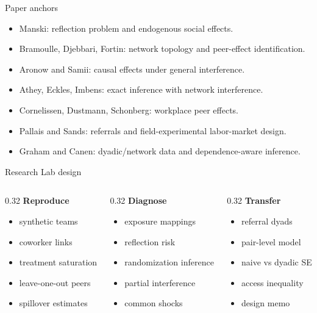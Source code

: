 \documentclass[aspectratio=169,11pt]{beamer}
\newcommand{\1}{\mathbf{1}}
\begin{document}
\begin{frame}{Paper anchors}
\begin{itemize}
    \item Manski: reflection problem and endogenous social effects.
    \item Bramoulle, Djebbari, Fortin: network topology and peer-effect identification.
    \item Aronow and Samii: causal effects under general interference.
    \item Athey, Eckles, Imbens: exact inference with network interference.
    \item Cornelissen, Dustmann, Schonberg: workplace peer effects.
    \item Pallais and Sands: referrals and field-experimental labor-market design.
    \item Graham and Canen: dyadic/network data and dependence-aware inference.
\end{itemize}
\end{frame}

\begin{frame}{Research Lab design}
\begin{columns}[T,onlytextwidth]
\begin{column}{0.32\linewidth}
\textbf{Reproduce}
\begin{itemize}
    \item synthetic teams
    \item coworker links
    \item treatment saturation
    \item leave-one-out peers
    \item spillover estimates
\end{itemize}
\end{column}
\begin{column}{0.32\linewidth}
\textbf{Diagnose}
\begin{itemize}
    \item exposure mappings
    \item reflection risk
    \item randomization inference
    \item partial interference
    \item common shocks
\end{itemize}
\end{column}
\begin{column}{0.32\linewidth}
\textbf{Transfer}
\begin{itemize}
    \item referral dyads
    \item pair-level model
    \item naive vs dyadic SE
    \item access inequality
    \item design memo
\end{itemize}
\end{column}
\end{columns}
\end{frame}
\end{document}
